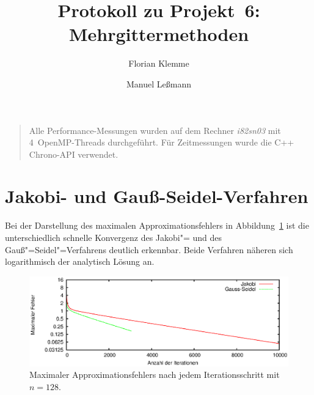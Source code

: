 \documentclass[paper = a4]{scrartcl}
\begin{document}
\subject{Praktikum Multicore"=Programmierung}
\title{Protokoll zu Projekt~6: Mehrgittermethoden}
\author{Florian Klemme \and Manuel Leßmann}
\maketitle

\begin{quote}
Alle Performance-Messungen wurden auf dem Rechner \emph{i82sn03} mit 4~OpenMP-Threads durchgeführt. Für Zeitmessungen wurde die C++ Chrono-API verwendet.
\end{quote}

\section{Jakobi- und Gauß-Seidel-Verfahren}

Bei der Darstellung des maximalen Approximationsfehlers in Abbildung~\ref{fig:fehler} ist die unterschiedlich schnelle Konvergenz des Jakobi"= und des Gauß"=Seidel"=Verfahrens deutlich erkennbar. Beide Verfahren näheren sich logarithmisch der analytisch Lösung an.

\begin{figure}
    \centering
    \includegraphics[width=\textwidth]{fehler}
    \caption{Maximaler Approximationsfehlers nach jedem Iterationsschritt mit \(n = 128\).}
    \label{fig:fehler}
\end{figure}
\end{document}
